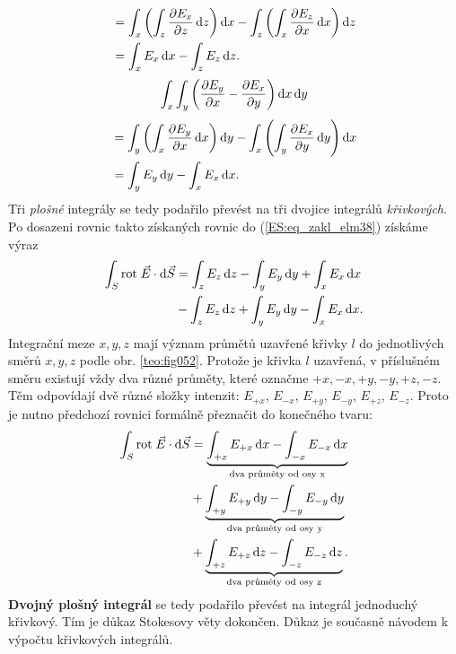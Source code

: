         \begin{align*}
           &= \int_x\left(\int_z\dfrac{\partial E_x}{\partial z}\mathop{}\!\mathrm{d}z\right)\mathop{}\!\mathrm{d}x 
            - \int_z\left(\int_x\dfrac{\partial E_z}{\partial x}\mathop{}\!\mathrm{d}x\right)\mathop{}\!\mathrm{d}z                  \\
           &= \int_xE_x\mathop{}\!\mathrm{d}x - \int_zE_z\mathop{}\!\mathrm{d}z.                              \\
        \end{align*}
        \begin{equation*}
          \int_x\int_y\left(\dfrac{\partial E_y}{\partial x} - \dfrac{\partial E_x}{\partial y}\right)\mathop{}\!\mathrm{d}x\mathop{}\!\mathrm{d}y
        \end{equation*}
        \begin{align*}
           &= \int_y\left(\int_x\dfrac{\partial E_y}{\partial x}\mathop{}\!\mathrm{d}x\right)\mathop{}\!\mathrm{d}y 
            - \int_x\left(\int_y\dfrac{\partial E_x}{\partial y}\mathop{}\!\mathrm{d}y\right)\mathop{}\!\mathrm{d}x                      \\
           &= \int_yE_y\mathop{}\!\mathrm{d}y - \int_xE_x\mathop{}\!\mathrm{d}x.         
        \end{align*}
        Tři \emph{plošné} integrály se tedy podařilo převést na tři dvojice integrálů 
        \emph{křivkových}. Po dosazeni rovnic takto získaných rovnic do (\ref{ES:eq_zakl_elm38}) 
        získáme výraz
        \begin{align*}
          \int_{S}\mathrm{rot}\;\vec{E}\cdot \mathop{}\!\mathrm{d}\vec{S} 
            &= \int_zE_z\mathop{}\!\mathrm{d}z - \int_yE_y\mathop{}\!\mathrm{d}y + \int_xE_x\mathop{}\!\mathrm{d}x                     \\
            &- \int_zE_z\mathop{}\!\mathrm{d}z + \int_yE_y\mathop{}\!\mathrm{d}y - \int_xE_x\mathop{}\!\mathrm{d}x.
        \end{align*}
        Integrační meze \(x, y, z\) mají význam průmětů uzavřené křivky \(l\) do jednotlivých směrů 
        \(x, y, z\) podle obr. \ref{teo:fig052}. Protože je křivka \(l\) 
        uzavřená, v příslušném směru existují vždy dva různé průměty, které označme \(+x, -x, +y, 
        -y, +z, -z\). Těm odpovídají dvě různé složky intenzit: \(E_{+x}\), \(E_{-x}\), \(E_{+y}\), 
        \(E_{-y}\), \(E_{+z}\), \(E_{-z}\). Proto je nutno předchozí rovnici formálně přeznačit do 
        konečného tvaru:
        \begin{align*}
          \int_{S}\mathrm{rot}\;\vec{E}\cdot \mathop{}\!\mathrm{d}\vec{S} 
             &= \underbrace{\int_{+x}E_{+x}\mathop{}\!\mathrm{d}x - \int_{-x}E_{-x}\mathop{}\!\mathrm{d}x}_\text{dva průměty od osy x}  \\
             &+ \underbrace{\int_{+y}E_{+y}\mathop{}\!\mathrm{d}y - \int_{-y}E_{-y}\mathop{}\!\mathrm{d}y}_\text{dva průměty od osy y}  \\ 
             &+ \underbrace{\int_{+z}E_{+z}\mathop{}\!\mathrm{d}z - \int_{-z}E_{-z}\mathop{}\!\mathrm{d}z}_\text{dva průměty od osy z}.
        \end{align*}
        \textbf{Dvojný plošný integrál} se tedy podařilo převést na integrál jednoduchý křivkový. 
        Tím je důkaz Stokesovy věty dokončen. Důkaz je současně návodem k výpočtu křivkových 
        integrálů.
        
